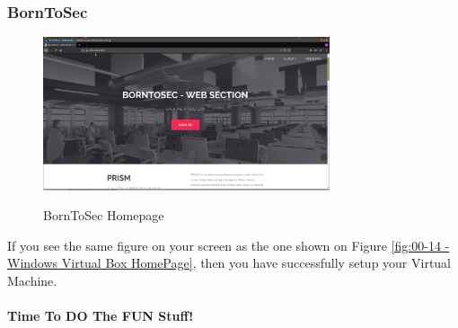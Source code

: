 \subsubsection{BornToSec}
\begin{figure}[!htb]
    \centering
    \includegraphics[width=0.752\textwidth]{images/00-14.png}\\[0cm]  
    \caption[Windows Virtual Box]{BornToSec Homepage}
    \label{fig:00-14 - Windows Virtual Box HomePage} 
\end{figure}
If you see the same figure on your screen as the one shown on Figure \vref{fig:00-14 - Windows Virtual Box HomePage},
then you have successfully setup your Virtual Machine.

\paragraph{Time To DO The FUN Stuff!}